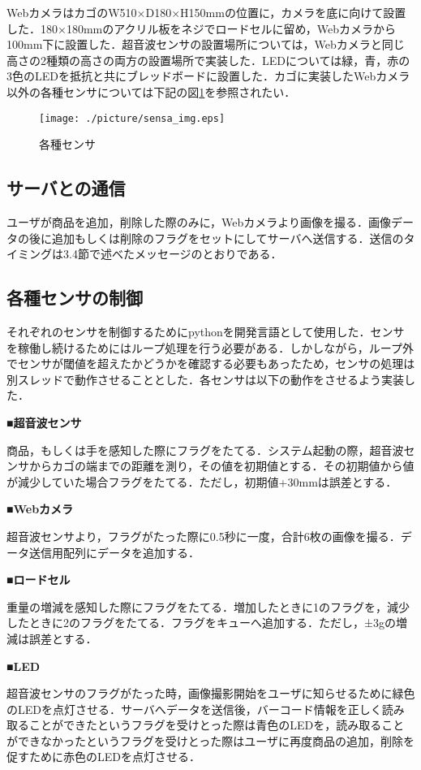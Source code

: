 WebカメラはカゴのW510×D180×H150mmの位置に，カメラを底に向けて設置した．180×180mmのアクリル板をネジでロードセルに留め，Webカメラから100mm下に設置した．超音波センサの設置場所については，Webカメラと同じ高さの2種類の高さの両方の設置場所で実装した．LEDについては緑，青，赤の3色のLEDを抵抗と共にブレッドボードに設置した．カゴに実装したWebカメラ以外の各種センサについては下記の図\ref{sensa}を参照されたい．

\begin{figure}[htbp]
\centering
\texttt{[image: ./picture/sensa\_img.eps]}
\caption{各種センサ}
\label{sensa}
\end{figure}


\subsection*{サーバとの通信}

ユーザが商品を追加，削除した際のみに，Webカメラより画像を撮る．画像データの後に追加もしくは削除のフラグをセットにしてサーバへ送信する．送信のタイミングは3.4節で述べたメッセージのとおりである．

\subsection*{各種センサの制御}

それぞれのセンサを制御するためにpythonを開発言語として使用した．センサを稼働し続けるためにはループ処理を行う必要がある．しかしながら，ループ外でセンサが閾値を超えたかどうかを確認する必要もあったため，センサの処理は別スレッドで動作させることとした．各センサは以下の動作をさせるよう実装した．

\noindent
{\bf ■超音波センサ}

商品，もしくは手を感知した際にフラグをたてる．システム起動の際，超音波センサからカゴの端までの距離を測り，その値を初期値とする．その初期値から値が減少していた場合フラグをたてる．ただし，初期値+30mmは誤差とする．

\noindent
{\bf ■Webカメラ}

超音波センサより，フラグがたった際に0.5秒に一度，合計6枚の画像を撮る．データ送信用配列にデータを追加する．

\noindent
{\bf ■ロードセル}

重量の増減を感知した際にフラグをたてる．増加したときに1のフラグを，減少したときに2のフラグをたてる．フラグをキューへ追加する．ただし，±3gの増減は誤差とする．

\noindent
{\bf ■LED}

超音波センサのフラグがたった時，画像撮影開始をユーザに知らせるために緑色のLEDを点灯させる．サーバへデータを送信後，バーコード情報を正しく読み取ることができたというフラグを受けとった際は青色のLEDを，読み取ることができなかったというフラグを受けとった際はユーザに再度商品の追加，削除を促すために赤色のLEDを点灯させる．

\newpage


